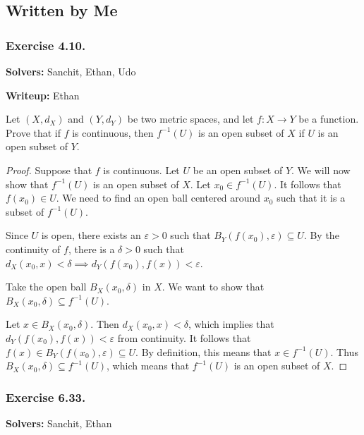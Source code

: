 \documentclass{article}
\theoremstyle{plain} %
\numberwithin{thm}{section} %
\theoremstyle{definition}
\begin{document}
    \subsection{Written by Me}

    \subsubsection{Exercise 4.10.}
    
    \noindent\textbf{Solvers:} Sanchit, Ethan, Udo
    
    \noindent\textbf{Writeup:} Ethan

    Let $(X,d_X)$ and $(Y,d_Y)$ be two metric spaces, and let $f:X\rightarrow Y$ be a function. Prove that if \(f\) is continuous, then $f^{-1}(U)$ is an open subset of $X$ if $U$ is an open subset of $Y$.

    \begin{proof}
        Suppose that \(f\) is continuous. Let \(U\) be an open subset of \(Y\). We will now show that \(f^{-1} (U)\) is an open subset of \(X\). Let \(x_0 \in f^{-1} (U)\). It follows that \(f(x_0) \in U\). We need to find an open ball centered around \(x_0\) such that it is a subset of \(f^{-1} (U)\).
        
        Since \(U\) is open, there exists an \(\varepsilon > 0\) such that \(B_Y(f(x_0), \varepsilon) \subseteq U\). By the continuity of \(f\), there is a \(\delta > 0\) such that \(d_X (x_0, x) < \delta \implies d_Y (f(x_0), f(x)) < \varepsilon\).
        
        Take the open ball \(B_X(x_0, \delta)\) in \(X\). We want to show that \(B_X (x_0, \delta) \subseteq f^{-1} (U)\).

        Let \(x \in B_X (x_0, \delta)\). Then \(d_X(x_0, x) < \delta\), which implies that \(d_Y (f(x_0), f(x)) < \varepsilon\) from continuity. It follows that \(f(x) \in B_Y (f(x_0), \varepsilon) \subseteq U\). By definition, this means that \(x \in f^{-1} (U)\). Thus \(B_X (x_0, \delta) \subseteq f^{-1} (U)\), which means that \(f^{-1} (U)\) is an open subset of \(X\).

    \end{proof}

    \subsubsection{Exercise 6.33.}

    \noindent\textbf{Solvers:} Sanchit, Ethan
    
\end{document}
